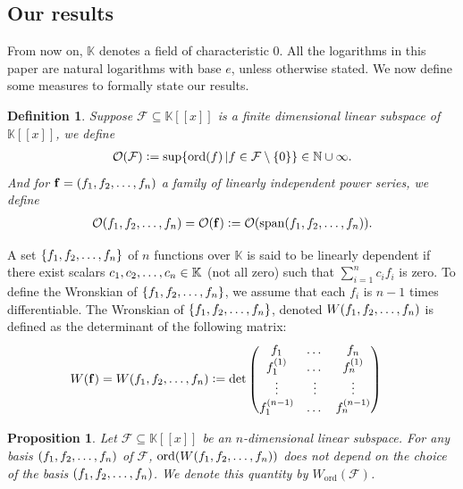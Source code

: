 \documentclass[a4paper, 11pt,dvipsnames]{article}
\newtheorem{proposition}{Proposition}
\newtheorem{definition}{Definition}
\DeclareMathOperator{\spn}{span}
\newcommand{\OF}{\mathcal{O}}
\newcommand{\ord}{\operatorname{ord}}
\newcommand{\eqdef}{\vcentcolon =}
\newcommand{\BK}{\mathbb{K}}
\begin{document}
  \subsection{Our results}
  \label{sec:our_results}
  From now on, $\BK$ denotes a field of characteristic 0. All the logarithms in this paper are natural logarithms with base $e$, unless otherwise stated. We now define some measures to formally state our results.
    \begin{definition} Suppose $\mathcal{F} \subseteq \BK[[x]]$ is a finite dimensional linear subspace of $\BK[[x]]$, we define \begin{align*}
    \OF(\mathcal{F})\eqdef \sup \{ \ord(f) \left| f \in \mathcal{F} \setminus \{0\}  \right \} \in \mathbb{N} \cup \infty.  \end{align*} And for $\mathbf{f} =
    (f_{1},f_{2},\dots,f_{n})$ a family of linearly independent power series, we  define \begin{align*} \OF(\lst f n) = \OF(\mathbf{f}) \eqdef \OF( \spn (\lst f n)).
    \end{align*} \end{definition} A set $\{f_{1},f_{2},\dots,f_{n}\}$  of $n$ functions over $\BK$ is said to be linearly dependent if there exist scalars $\lst c n \in \BK$ (not all zero)
    such that $\sum_{i=1}^{n}c_if_i$ is zero. To define the Wronskian of $\{f_{1},f_{2},\dots,f_{n}\}$, we assume that each $f_i$ is $n-1$ times differentiable.  The Wronskian of
    $\{f_{1},f_{2},\dots,f_{n}\}$, denoted $W(f_{1},f_{2},\dots,f_{n})$ is defined as the determinant of the following matrix: \begin{align*} &W(\mathbf{f})= W(\lst f n) \eqdef \det\begin{pmatrix} f_1 & \dots &
      f_n \\ f_1^{(1)} & \dots & f_n^{(1)} \\ \vdots & \vdots & \vdots \\ f_1^{(n-1)}  & \dots & f_n^{(n-1)} \end{pmatrix}  \end{align*}
      \begin{proposition} Let $\mathcal{F} \subseteq \BK[[x]]$ be an $n$-dimensional linear subspace. For any basis $(f_{1},f_{2},\dots,f_{n})$  of $\mathcal{F}$,  $\ord (W(\lst f n))$ does not depend on the choice of the basis $(f_{1},f_{2},\dots,f_{n})$. We denote this quantity by
    $W_{\ord}(\mathcal{F})$.  \label{prop:ord_Wr_subspace} \end{proposition}
\end{document}
